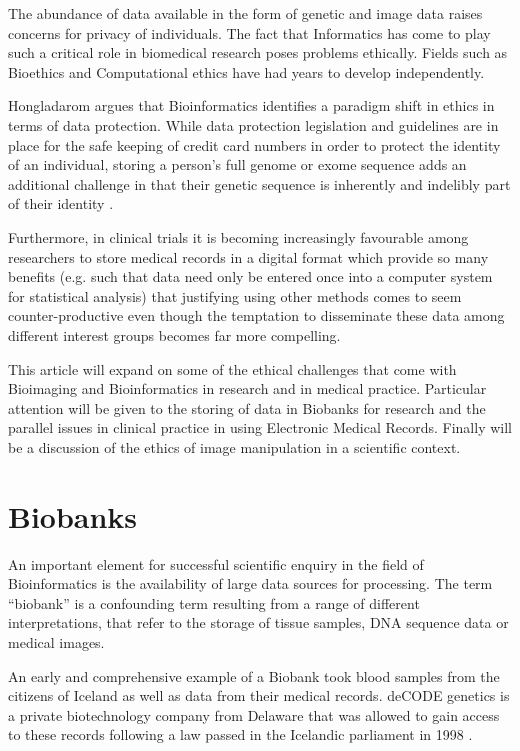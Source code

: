 \documentclass[british,a4paper, 12pt]{article}
\begin{document}
The abundance of data available in the form of genetic and image data raises
concerns for privacy of individuals. The fact that Informatics has come to
play such a critical role in biomedical research poses problems ethically.
Fields such as Bioethics and Computational ethics have had years to develop
independently.

Hongladarom argues that Bioinformatics identifies a paradigm shift in ethics in
terms of data protection. While data protection legislation and guidelines are in place for the
safe keeping of credit card numbers in order to protect the identity of an
individual, storing a person's full genome or exome sequence adds an additional
challenge in that their genetic sequence is inherently and indelibly part of
their identity \parencite{hongladarom2006ethics}.

Furthermore, in clinical trials it is becoming increasingly favourable among researchers to
store medical records in a digital format which provide so many benefits (e.g. 
such that data need only be entered once into a computer system for statistical 
analysis) \parencite{parizel2011keep} that justifying using other methods comes to seem
counter-productive even though the temptation to disseminate these data among
different interest groups becomes far more compelling.

This article will expand on some of the ethical challenges that come with
Bioimaging and Bioinformatics in research and in medical practice. Particular attention will be given
to the storing of data in Biobanks for research and the parallel issues in clinical practice in
using Electronic Medical Records. Finally will be a discussion of the ethics of image manipulation
in a scientific context.

\section{Biobanks}
An important element for successful scientific enquiry in the field of
Bioinformatics is the availability of large data sources for processing. The
term ``biobank'' is a confounding term resulting from a range of different
interpretations, that refer to the storage of tissue samples, DNA sequence data or
medical images.

An early and comprehensive example of a Biobank took blood samples from the
citizens of Iceland as well as data from their medical records. deCODE
genetics is a private biotechnology company from Delaware that was allowed to
gain access to these records following a law passed in the Icelandic parliament
in 1998 \parencite{chadwick1999icelandic}.
\end{document}
